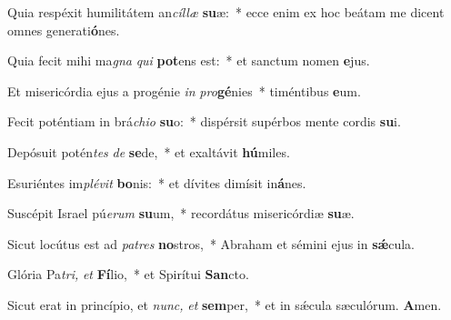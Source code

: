 \item Quia respéxit humilitátem an\textit{cíllæ} \textbf{su}æ:~* ecce enim ex hoc beátam me dicent omnes generati\textbf{ó}nes.
\item Quia fecit mihi ma\textit{gna} \textit{qui} \textbf{pot}ens est:~* et sanctum nomen \textbf{e}jus.
\item Et misericórdia ejus a progénie \textit{in} \textit{pro}\textbf{gé}nies~* timéntibus \textbf{e}um.
\item Fecit poténtiam in brá\textit{chio} \textbf{su}o:~* dispérsit supérbos mente cordis \textbf{su}i.
\item Depósuit potén\textit{tes} \textit{de} \textbf{se}de,~* et exaltávit \textbf{hú}miles.
\item Esuriéntes im\textit{plévit} \textbf{bo}nis:~* et dívites dimísit in\textbf{á}nes.
\item Suscépit Israel pú\textit{erum} \textbf{su}um,~* recordátus misericórdiæ \textbf{su}æ.
\item Sicut locútus est ad \textit{patres} \textbf{no}stros,~* Abraham et sémini ejus in \textbf{sǽ}cula.
\item Glória Pa\hspace*{0.01em}\textit{tri,} \textit{et} \textbf{Fí}lio,~* et Spirítui \textbf{San}cto.
\item Sicut erat in princípio, et \textit{nunc,} \textit{et} \textbf{sem}per,~* et in sǽcula sæculórum. \textbf{A}men.